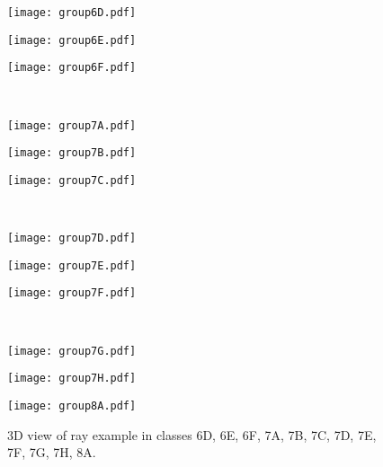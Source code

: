 \begin{figure}[htps]
\centering
\begin{minipage}[c]{0.325\textwidth}
\texttt{[image: group6D.pdf]}
\end{minipage}
\begin{minipage}[c]{0.325\textwidth}
\texttt{[image: group6E.pdf]}
\end{minipage}
\begin{minipage}[c]{0.325\textwidth}
\texttt{[image: group6F.pdf]}
\end{minipage}\\

\begin{minipage}[c]{0.325\textwidth}
\texttt{[image: group7A.pdf]}
\end{minipage}
\begin{minipage}[c]{0.325\textwidth}
\texttt{[image: group7B.pdf]}
\end{minipage}
\begin{minipage}[c]{0.325\textwidth}
\texttt{[image: group7C.pdf]}
\end{minipage}\\

\begin{minipage}[c]{0.325\textwidth}
\texttt{[image: group7D.pdf]}
\end{minipage}
\begin{minipage}[c]{0.325\textwidth}
\texttt{[image: group7E.pdf]}
\end{minipage}
\begin{minipage}[c]{0.325\textwidth}
\texttt{[image: group7F.pdf]}
\end{minipage}\\

\begin{minipage}[c]{0.325\textwidth}
\texttt{[image: group7G.pdf]}
\end{minipage}
\begin{minipage}[c]{0.325\textwidth}
\texttt{[image: group7H.pdf]}
\end{minipage}
\begin{minipage}[c]{0.325\textwidth}
\texttt{[image: group8A.pdf]}
\end{minipage}

\caption{3D view of ray example in classes 6D, 6E, 6F, 7A, 7B, 7C, 7D, 7E, 7F, 7G, 7H, 8A.}
\label{fig:modelClass3D1}
\end{figure}


